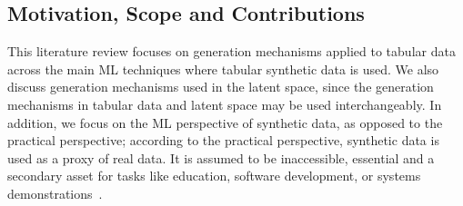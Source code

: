\subsection{Motivation, Scope and Contributions}


This literature review focuses on generation mechanisms applied to tabular
data across the main ML techniques where tabular synthetic data is used.  We
also discuss generation mechanisms used in the latent space, since the
generation mechanisms in tabular data and latent space may be used
interchangeably. In addition, we focus on the ML perspective of synthetic
data, as opposed to the practical perspective; according to the practical
perspective, synthetic data is used as a proxy of real data. It is assumed to
be inaccessible, essential and a secondary asset for tasks like education,
software development, or systems demonstrations~\cite{mannino2019real}. 

